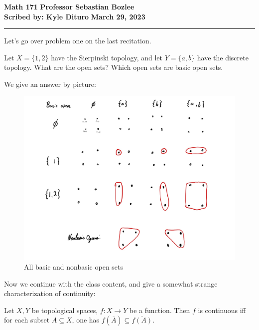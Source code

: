 \documentclass[12pt, twosided]{article}
\begin{document}
\noindent \textbf{Math 171} \hfill \textbf{Professor Sebastian Bozlee} \\
\textbf{Scribed by: Kyle Dituro} \hfill \textbf{March 29, 2023}\hrule
\vspace{.2in}

Let's go over problem one on the last recitation.

\begin{ques}
  Let \(X = \{1, 2\}\) have the Sierpinski topology, and let \(Y = \{a, b\}\) have the discrete topology. What are the open sets? Which open sets are basic open sets.
\end{ques}

We give an answer by picture:

\begin{figure}[h]
  \centering
  \includegraphics[width=\textwidth]{openchart}
  \caption{All basic and nonbasic open sets}
\end{figure}

Now we continue with the class content, and give a somewhat strange characterization of continuity:

\begin{thm}
  Let \(X, Y\) be topological spaces, \(f: X \to Y\) be a function. Then \(f\) is continuous iff for each subset \(A \subseteq X\), one has \(f(\overline{A}) \subseteq \overline{f(A)}\).
\end{thm}
\end{document}
